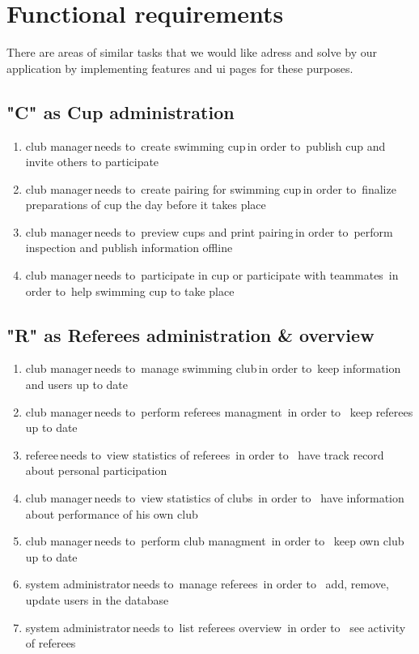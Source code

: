 \section{Functional requirements}
There are areas of similar tasks that we would like adress and solve by our application by implementing features and ui pages for these purposes.
\subsection*{"C" as Cup administration}
\begin{enumerate}
    \item \lbrack club manager\rbrack \,needs to\, \lbrack create swimming cup\rbrack \,in order to\, \lbrack publish cup and invite others to participate\rbrack
    \item \lbrack club manager\rbrack \,needs to\, \lbrack create pairing for swimming cup\rbrack \,in order to\, \lbrack finalize preparations of cup the day before it takes place\rbrack
    \item \lbrack club manager\rbrack \,needs to\, \lbrack preview cups and print pairing\rbrack \,in order to\, \lbrack perform inspection and publish information offline\rbrack
    \item \lbrack club manager\rbrack \,needs to\, \lbrack participate in cup or participate with teammates\rbrack \, in order to\, \lbrack help swimming cup to take place\rbrack
\end{enumerate} 
\subsection*{"R" as Referees administration \& overview}
\begin{enumerate}
\item \lbrack club manager\rbrack \,needs to\, \lbrack manage swimming club\rbrack \,in order to\, \lbrack keep information and users up to date\rbrack
\item \lbrack club manager\rbrack \,needs to\, \lbrack perform referees managment\rbrack \, in order to \, \lbrack keep referees up to date\rbrack
\item \lbrack referee\rbrack \,needs to\, \lbrack view statistics of referees\rbrack \, in order to \, \lbrack have track record about personal participation\rbrack
\item \lbrack club manager\rbrack \,needs to\, \lbrack view statistics of clubs\rbrack \, in order to \, \lbrack have information about performance of his own club\rbrack
\item \lbrack club manager\rbrack \,needs to\, \lbrack perform club managment\rbrack \, in order to \, \lbrack keep own club up to date\rbrack
\item \lbrack system administrator\rbrack \,needs to\, \lbrack manage referees\rbrack \, in order to \, \lbrack add, remove, update users in the database\rbrack
\item \lbrack system administrator\rbrack \,needs to\, \lbrack list referees overview\rbrack \, in order to \, \lbrack see activity of referees\rbrack
\end{enumerate} 
